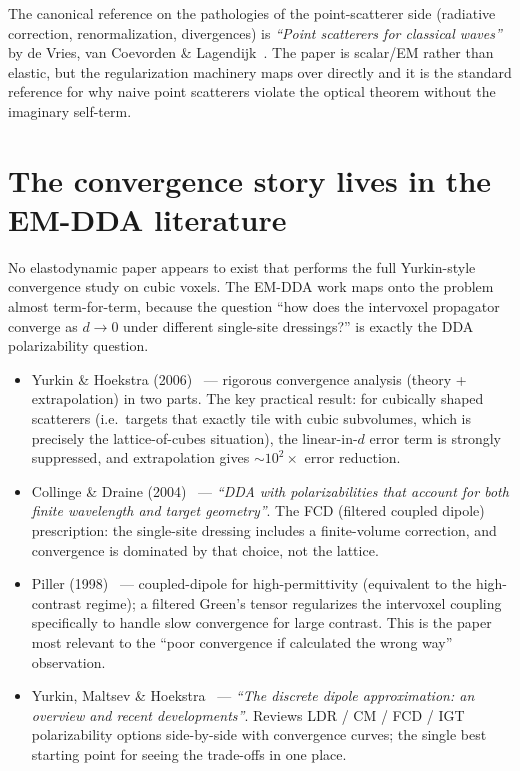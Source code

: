 \documentclass[11pt,a4paper]{article}
\begin{document}
The canonical reference on the pathologies of the point-scatterer side
(radiative correction, renormalization, divergences) is
\emph{``Point scatterers for classical waves''}
by de Vries, van Coevorden \& Lagendijk~\cite{deVries1998}. The paper
is scalar/EM rather than elastic, but the regularization machinery
maps over directly and it is the standard reference for why naive
point scatterers violate the optical theorem without the imaginary
self-term.

\section{The convergence story lives in the EM-DDA literature}

No elastodynamic paper appears to exist that performs the full
Yurkin-style convergence study on cubic voxels. The EM-DDA work maps
onto the problem almost term-for-term, because the question
``how does the intervoxel propagator converge as $d \to 0$ under
different single-site dressings?'' is exactly the DDA polarizability
question.

\begin{itemize}[leftmargin=1.5em]
  \item Yurkin \& Hoekstra (2006)~\cite{YurkinHoekstra2006a,YurkinHoekstra2006b}
        --- rigorous convergence analysis (theory + extrapolation) in
        two parts. The key practical result: for cubically shaped
        scatterers (i.e.\ targets that exactly tile with cubic
        subvolumes, which is precisely the lattice-of-cubes situation),
        the linear-in-$d$ error term is strongly suppressed, and
        extrapolation gives $\sim\!10^2\times$ error reduction.
  \item Collinge \& Draine (2004)~\cite{CollingeDraine2004} ---
        \emph{``DDA with polarizabilities that account for both finite
        wavelength and target geometry''}. The FCD (filtered coupled
        dipole) prescription: the single-site dressing includes a
        finite-volume correction, and convergence is dominated by
        that choice, not the lattice.
  \item Piller (1998)~\cite{Piller1998} --- coupled-dipole for
        high-permittivity (equivalent to the high-contrast regime);
        a filtered Green's tensor regularizes the intervoxel coupling
        specifically to handle slow convergence for large contrast.
        This is the paper most relevant to the ``poor convergence if
        calculated the wrong way'' observation.
  \item Yurkin, Maltsev \& Hoekstra~\cite{YurkinReview2007} ---
        \emph{``The discrete dipole approximation: an overview and
        recent developments''}. Reviews LDR / CM / FCD / IGT
        polarizability options side-by-side with convergence curves;
        the single best starting point for seeing the trade-offs in
        one place.
\end{itemize}
\end{document}
